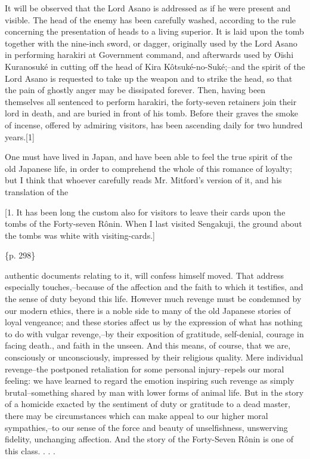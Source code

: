 It will be observed that the Lord Asano is addressed as if he were present and visible. The head of the enemy has been carefully washed, according to the rule concerning the presentation of heads to a living superior. It is laid upon the tomb together with the nine-inch sword, or dagger, originally used by the Lord Asano in performing harakiri at Government command, and afterwards used by Oïshi Kuranosuké in cutting off the head of Kira Kôtsuké-no-Suké;--and the spirit of the Lord Asano is requested to take up the weapon and to strike the head, so that the pain of ghostly anger may be dissipated forever. Then, having been themselves all sentenced to perform harakiri, the forty-seven retainers join their lord in death, and are buried in front of his tomb. Before their graves the smoke of incense, offered by admiring visitors, has been ascending daily for two hundred years.[1]

One must have lived in Japan, and have been able to feel the true spirit of the old Japanese life, in order to comprehend the whole of this romance of loyalty; but I think that whoever carefully reads Mr. Mitford's version of it, and his translation of the

[1. It has been long the custom also for visitors to leave their cards upon the tombs of the Forty-seven Rônin. When I last visited Sengakuji, the ground about the tombs was white with visiting-cards.]

\{p. 298\}

authentic documents relating to it, will confess himself moved. That address especially touches,--because of the affection and the faith to which it testifies, and the sense of duty beyond this life. However much revenge must be condemned by our modern ethics, there is a noble side to many of the old Japanese stories of loyal vengeance; and these stories affect us by the expression of what has nothing to do with vulgar revenge,--by their exposition of gratitude, self-denial, courage in facing death., and faith in the unseen. And this means, of course, that we are, consciously or unconsciously, impressed by their religious quality. Mere individual revenge--the postponed retaliation for some personal injury--repels our moral feeling: we have learned to regard the emotion inspiring such revenge as simply brutal--something shared by man with lower forms of animal life. But in the story of a homicide exacted by the sentiment of duty or gratitude to a dead master, there may be circumstances which can make appeal to our higher moral sympathies,--to our sense of the force and beauty of unselfishness, unswerving fidelity, unchanging affection. And the story of the Forty-Seven Rônin is one of this class. . . .



